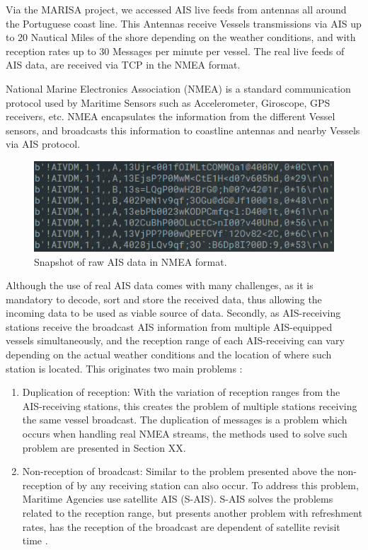 Via the MARISA project, we accessed AIS live feeds from antennas all around the Portuguese coast line. This Antennas receive Vessels transmissions via AIS up to 20 Nautical Miles of the shore depending on the weather conditions, and with reception rates up to 30 Messages per minute per vessel. The real live feeds of AIS data, are received via TCP in the NMEA format.

National Marine Electronics Association (NMEA) is a standard communication protocol used by Maritime Sensors such as Accelerometer, Giroscope, GPS receivers, etc.
NMEA encapsulates the information from the different Vessel sensors, and broadcasts this information to coastline antennas and nearby Vessels via AIS protocol.

\begin{figure}[H]
\centering
\includegraphics[scale = .5]{figures/Ch3/NMEAexample.png}
\caption{Snapshot of raw AIS data in NMEA format.}
\label{fig:NMEAexample}
\end{figure}
Although the use of real AIS data comes with many challenges, as it is mandatory to decode, sort and store the received data, thus allowing the incoming data to be used as viable source of data. Secondly, as AIS-receiving stations receive the broadcast AIS information from multiple AIS-equipped vessels simultaneously, and the reception range of each AIS-receiving can vary depending on the actual weather conditions and the location of where such station is located. This originates two main problems :
\begin{enumerate}
\item Duplication of reception:  With the variation of reception ranges from the AIS-receiving stations, this creates the problem of multiple stations receiving the same vessel broadcast. The duplication of messages is a problem which occurs when handling real NMEA streams, the methods used to solve such problem are presented in Section XX.

\item Non-reception of broadcast: Similar to the problem presented above the non-reception of by any receiving station can also occur. To address this problem, Maritime Agencies use satellite AIS (S-AIS). S-AIS solves the problems related to the reception range, but presents another problem with refreshment rates, has the reception of the broadcast are dependent of satellite revisit time \cite{Robards2016ConservationReview}. 
\end{enumerate}


